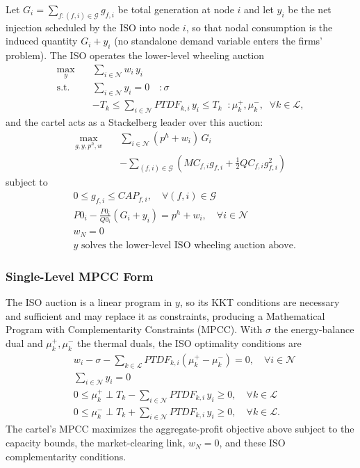 \documentclass[lettersize,journal]{IEEEtran}
\begin{document}
Let $G_i = \sum_{f:(f,i)\in\mathcal{G}} g_{f,i}$ be total generation at node
$i$ and let $y_i$ be the net injection scheduled by the ISO into node $i$,
so that nodal consumption is the induced quantity $G_i + y_i$ (no
standalone demand variable enters the firms' problem). The ISO operates the
lower-level wheeling auction
\begin{equation}
\begin{split}
\max_{y} \quad & \sum_{i \in \mathcal{N}} w_i\, y_i \\
\text{s.t.}\quad & \sum_{i \in \mathcal{N}} y_i = 0 \quad : \sigma \\
& -T_k \le \sum_{i \in \mathcal{N}} PTDF_{k,i}\, y_i \le T_k
   \;\; : \mu_k^{+},\mu_k^{-}, \;\; \forall k \in \mathcal{L},
\end{split}
\end{equation}
and the cartel acts as a Stackelberg leader over this auction:
\begin{equation}
\begin{split}
\max_{g, y, p^h, w} \quad & \sum_{i \in \mathcal{N}} (p^h + w_i)\, G_i \\
& - \sum_{(f,i) \in \mathcal{G}}
  \left( MC_{f,i} g_{f,i} + \tfrac{1}{2} QC_{f,i} g_{f,i}^2 \right)
\end{split}
\end{equation}
subject to
\begin{align}
& 0 \le g_{f,i} \le CAP_{f,i}, \quad \forall (f,i) \in \mathcal{G} \\
& P0_i - \frac{P0_i}{Q0_i}\left( G_i + y_i \right) = p^h + w_i,
   \quad \forall i \in \mathcal{N} \\
& w_N = 0 \\
& y \text{ solves the lower-level ISO wheeling auction above.}
\end{align}

\subsubsection{Single-Level MPCC Form}

The ISO auction is a linear program in $y$, so its KKT conditions are
necessary and sufficient and may replace it as constraints, producing a
Mathematical Program with Complementarity Constraints (MPCC). With $\sigma$
the energy-balance dual and $\mu_k^{+}, \mu_k^{-}$ the thermal duals, the
ISO optimality conditions are
\begin{align}
& w_i - \sigma - \sum_{k \in \mathcal{L}} PTDF_{k,i}(\mu_k^{+} - \mu_k^{-})
   = 0, \quad \forall i \in \mathcal{N} \\
& \sum_{i \in \mathcal{N}} y_i = 0 \\
& 0 \le \mu_k^{+} \perp T_k - \sum_{i \in \mathcal{N}} PTDF_{k,i}\, y_i \ge 0,
   \quad \forall k \in \mathcal{L} \\
& 0 \le \mu_k^{-} \perp T_k + \sum_{i \in \mathcal{N}} PTDF_{k,i}\, y_i \ge 0,
   \quad \forall k \in \mathcal{L}.
\end{align}
The cartel's MPCC maximizes the aggregate-profit objective above subject to
the capacity bounds, the market-clearing link, $w_N = 0$, and these ISO
complementarity conditions.
\end{document}
